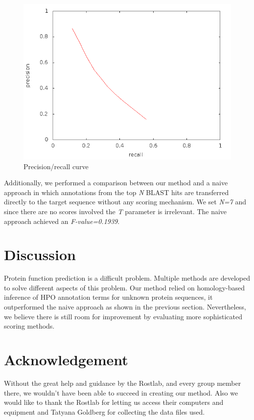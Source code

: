 \documentclass{bioinfo}
\begin{document}
\begin{figure}[!tpb]
\centerline{\includegraphics[scale=0.4]{bilder/image-4.png}}
\caption{Precision/recall curve}
\label{precrec}
\end{figure}

Additionally, we performed a comparison between our method and a naive approach in which annotations from the top \textit{N} BLAST hits are transferred directly to the target sequence without any scoring mechanism. We set \textit{N=7} and since there are no scores involved the \textit{T} parameter is irrelevant. The naive approach achieved an \textit{F-value=0.1939}.

\section{Discussion}

Protein function prediction is a difficult problem. Multiple methods are developed to solve different aspects of this problem. Our method relied on homology-based inference of HPO annotation terms for unknown protein sequences, it outperformed the naive approach as shown in the previous section. Nevertheless, we believe there is still room for improvement by evaluating more sophisticated scoring methods.

\section*{Acknowledgement}
Without the great help and guidance by the Rostlab, and every group member there, we wouldn't have been able to succeed in creating our method. Also we would like to thank the Rostlab for letting us access their computers and equipment and Tatyana Goldberg for collecting the data files used.
\end{document}
